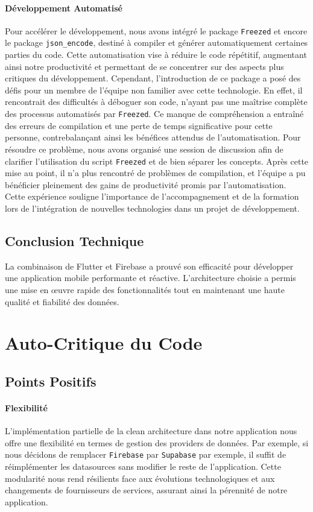 \paragraph{Développement Automatisé}
Pour accélérer le développement, nous avons intégré le package \texttt{Freezed} et encore le package \texttt{json\_encode}, destiné à compiler et générer automatiquement certaines parties du code. Cette automatisation vise à réduire le code répétitif, augmentant ainsi notre productivité et permettant de se concentrer sur des aspects plus critiques du développement. Cependant, l'introduction de ce package a posé des défis pour un membre de l'équipe non familier avec cette technologie. En effet, il rencontrait des difficultés à déboguer son code, n'ayant pas une maîtrise complète des processus automatisés par \texttt{Freezed}. Ce manque de compréhension a entraîné des erreurs de compilation et une perte de temps significative pour cette personne, contrebalançant ainsi les bénéfices attendus de l'automatisation. Pour résoudre ce problème, nous avons organisé une session de discussion afin de clarifier l'utilisation du script \texttt{Freezed} et de bien séparer les concepts. Après cette mise au point, il n'a plus rencontré de problèmes de compilation, et l'équipe a pu bénéficier pleinement des gains de productivité promis par l'automatisation. Cette expérience souligne l'importance de l'accompagnement et de la formation lors de l'intégration de nouvelles technologies dans un projet de développement.


\subsection{Conclusion Technique}

La combinaison de Flutter et Firebase a prouvé son efficacité pour développer une application mobile performante et réactive. L'architecture choisie a permis une mise en œuvre rapide des fonctionnalités tout en maintenant une haute qualité et fiabilité des données.

\section{Auto-Critique du Code}

\subsection{Points Positifs}

\paragraph{Flexibilité}
L'implémentation partielle de la clean architecture dans notre application nous offre une flexibilité en termes de gestion des providers de données. Par exemple, si nous décidons de remplacer \texttt{Firebase} par \texttt{Supabase} par exemple, il suffit de réimplémenter les datasources sans modifier le reste de l'application. Cette modularité nous rend résilients face aux évolutions technologiques et aux changements de fournisseurs de services, assurant ainsi la pérennité de notre application.


